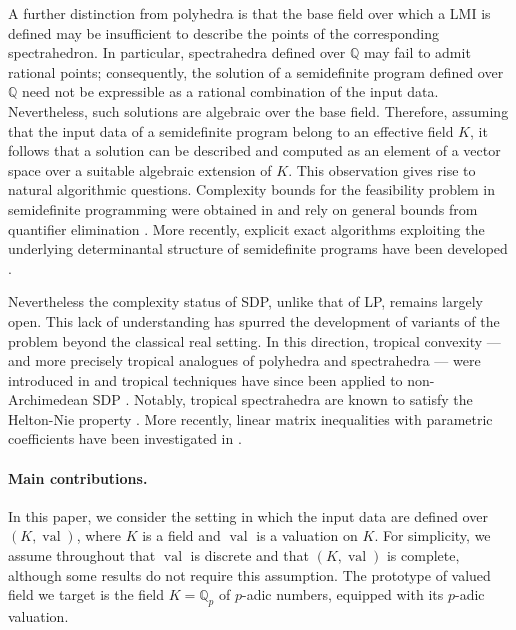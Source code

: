 \documentclass[sigconf]{acmart}
\DeclareMathOperator{\val}{val}
\def\QQ{\ensuremath{\mathbb{Q}}}
\providecommand{\DIFaddbegin}{} %
\newcommand{\DIFaddincludegraphics}[2][]{{\color{blue}\fbox{\DIFOincludegraphics[#1]{#2}}}} %
\DeclareRobustCommand{\DIFaddbegin}{\DIFOaddbegin \let\includegraphics\DIFaddincludegraphics} %
\begin{document}
A further distinction from polyhedra is that the base field over which a LMI is defined may be insufficient to describe the points of the corresponding spectrahedron. In particular, spectrahedra defined over $\QQ$ may fail to admit rational points; consequently, the solution of a semidefinite program defined over $\QQ$ need not be expressible as a rational combination of the input data. Nevertheless, such solutions are algebraic over the base field. Therefore, assuming that the input data of a semidefinite program belong to an effective field $K$, it follows that a solution can be described and computed as an element of a vector space over a suitable algebraic extension of $K$. This observation gives rise to natural algorithmic questions. Complexity bounds for the feasibility problem in semidefinite programming were obtained in \cite{porkolab1997complexity} and rely on general bounds from quantifier elimination \cite{renegar1992computational}. More recently, explicit exact algorithms exploiting the underlying determinantal structure of semidefinite programs have been developed \cite{henrion2016exact,NALDI2018206}.

Nevertheless the complexity status of SDP, unlike that of LP, remains largely
open. This lack of understanding has spurred the development of variants of the problem beyond the classical 
real setting.
In this direction, tropical convexity --- and more precisely tropical analogues of polyhedra and spectrahedra ---
were introduced in \cite{develin2004tropical,allamigeon_tropical_2020} and tropical techniques have since been applied to
non-Archimedean SDP \cite{allamigeon2016solving}. Notably, tropical spectrahedra are known to satisfy
the Helton-Nie property \cite{allamigeon2019tropical}. More recently, linear matrix inequalities with parametric coefficients
have been investigated in \cite{naldi2025solving}.

\paragraph{Main contributions.}
In this paper, we consider the setting in which the input data are defined over $(K,\val)$, where $K$ is a field and
$\val$ is a valuation on $K$. For simplicity, we assume throughout that $\val$ is discrete and that $(K,\val)$ is complete, although some results do not require this assumption. The prototype of valued field we target is the field $K=\QQ_p$ of $p$-adic numbers, equipped with its $p$-adic valuation.

\DIFaddbegin 
\end{document}
